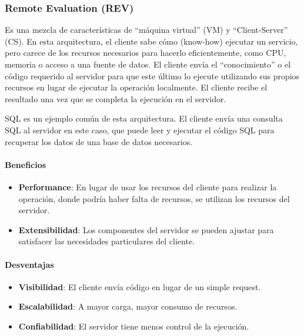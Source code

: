 \documentclass{article}
\begin{document}
		\subsubsection{Remote Evaluation (REV)}
		Es una mezcla de características de ``máquina virtual'' (VM) y ``Client-Server'' (CS). En esta arquitectura, el cliente sabe cómo (know-how) ejecutar un servicio, pero carece de los recursos necesarios para hacerlo eficientemente, como CPU, memoria o acceso a una fuente de datos. El cliente envía el ``conocimiento'' o el código requerido al servidor para que este último lo ejecute utilizando sus propios recursos en lugar de ejecutar la operación localmente. El cliente recibe el resultado una vez que se completa la ejecución en el servidor.
		
		SQL es un ejemplo común de esta arquitectura. El cliente envía una consulta SQL al servidor en este caso, que puede leer y ejecutar el código SQL para recuperar los datos de una base de datos necesarios.
		
		\paragraph{Beneficios}
		\begin{itemize}	
			\item {\textbf{Performance}}: En lugar de usar los recursos del cliente para realizar la operación, donde podría haber falta de recursos, se utilizan los recursos del servidor.
			
			\item {\textbf{Extensibilidad}}: Los componentes del servidor se pueden ajustar para satisfacer las necesidades particulares del cliente.
			
		\end{itemize}
		
		\paragraph{Desventajas}
			\begin{itemize}	
				\item {\textbf{Visibilidad}}: El cliente envía código en lugar de un simple request.			
				\item {\textbf{Escalabilidad}}: A mayor carga, mayor consumo de recursos.	
				\item {\textbf{Confiabilidad}}: El servidor tiene menos control de la ejecución.	
			\end{itemize}
		
		
\end{document}
